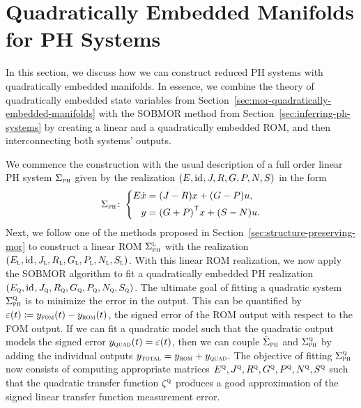 \section{Quadratically Embedded Manifolds for \texorpdfstring{\ac{PH}}{PH} Systems}\label{sec:quadratically-embedded-manifolds-ph-systems}

In this section, we discuss how we can construct reduced \ac{PH} systems with quadratically embedded manifolds.
In essence, we combine the theory of quadratically embedded state variables from Section~\ref{sec:mor-quadratically-embedded-manifolds} with the \ac{SOBMOR} method from Section~\ref{sec:inferring-ph-systems} by creating a linear and a quadratically embedded \ac{ROM}, and then interconnecting both systems' outputs.

We commence the construction with the usual description of a full order linear \ac{PH} system $\Sigma_{\textnormal{\scshape ph}}$ given by the realization $(E, \text{id}_{}, J, R, G, P, N, S)$ in the form
\begin{equation*}
    \Sigma_{\textnormal{\scshape ph}} \colon \left\lbrace
    \begin{aligned}
        E \dot{x} &= (J - R) x + (G - P) u, \\
        y &= {(G + P)}^{\mkern1mu \mathsf{T}} x + (S - N) u.
    \end{aligned}
    \right.
\end{equation*}
Next, we follow one of the methods proposed in Section~\ref{sec:structure-preserving-mor} to construct a linear \ac{ROM} $\Sigma_{\textnormal{\scshape ph}}^{\textnormal{\scshape l}}$ with the realization $(E_{\textnormal{\scshape l}}, \text{id}_{}, J_{\textnormal{\scshape l}}, R_{\textnormal{\scshape l}}, G_{\textnormal{\scshape l}}, P_{\textnormal{\scshape l}}, N_{\textnormal{\scshape l}}, S_{\textnormal{\scshape l}})$.
With this linear \ac{ROM} realization, we now apply the \ac{SOBMOR} algorithm to fit a quadratically embedded \ac{PH} realization $(E_{\textnormal{\scshape q}}, \text{id}_{}, J_{\textnormal{\scshape q}}, R_{\textnormal{\scshape q}}, G_{\textnormal{\scshape q}}, P_{\textnormal{\scshape q}}, N_{\textnormal{\scshape q}}, S_{\textnormal{\scshape q}})$.
The ultimate goal of fitting a quadratic system $\Sigma_{\textnormal{\scshape ph}}^{\textnormal{\scshape q}}$ is to minimize the error in the output.
This can be quantified by $\varepsilon(t) \coloneqq y_{\textnormal{\scshape fom}}(t) - y_{\textnormal{\scshape rom}}(t)$, the signed error of the \ac{ROM} output with respect to the \ac{FOM} output.
If we can fit a quadratic model such that the quadratic output models the signed error $y_{\textnormal{\scshape quad}}(t) = \varepsilon(t)$, then we can couple $\hat{\Sigma}_{\textnormal{\scshape ph}}$ and $\Sigma_{\textnormal{\scshape ph}}^{\textnormal{\scshape q}}$ by adding the individual outputs $y_{\textnormal{\scshape total}} = y_{\textnormal{\scshape rom}} + y_{\textnormal{\scshape quad}}$.
The objective of fitting $\Sigma_{\textnormal{\scshape ph}}^{\textnormal{\scshape q}}$ now consists of computing appropriate matrices $E^{\textnormal{\scshape q}}, J^{\textnormal{\scshape q}}, R^{\textnormal{\scshape q}}, G^{\textnormal{\scshape q}}, P^{\textnormal{\scshape q}}, N^{\textnormal{\scshape q}}, S^{\textnormal{\scshape q}}$ such that the quadratic transfer function $\zeta^{\textnormal{\scshape q}}$ produces a good approximation of the signed linear transfer function measurement error.

